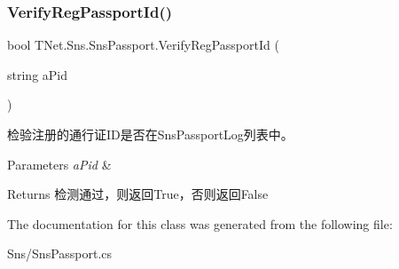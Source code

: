 \subsubsection{\texorpdfstring{Verify\+Reg\+Passport\+Id()}{VerifyRegPassportId()}}
{\footnotesize\ttfamily bool T\+Net.\+Sns.\+Sns\+Passport.\+Verify\+Reg\+Passport\+Id (\begin{DoxyParamCaption}\item[{string}]{a\+Pid }\end{DoxyParamCaption})}



检验注册的通行证\+I\+D是否在\+Sns\+Passport\+Log列表中。 


\begin{DoxyParams}{Parameters}
{\em a\+Pid} & \\
\hline
\end{DoxyParams}
\begin{DoxyReturn}{Returns}
检测通过，则返回\+True，否则返回\+False
\end{DoxyReturn}


The documentation for this class was generated from the following file\+:\begin{DoxyCompactItemize}
\item 
Sns/Sns\+Passport.\+cs\end{DoxyCompactItemize}
